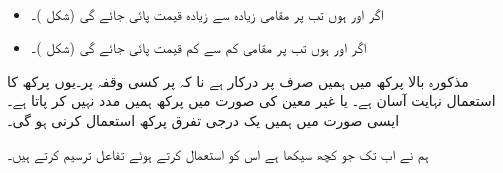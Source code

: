 \\
\begin{itemize}
\item
اگر  اور  ہوں تب  پر مقامی زیادہ سے زیادہ قیمت پائی جائے گی (شکل )۔
\item
اگر  اور  ہوں تب  پر مقامی کم سے کم قیمت پائی جائے گی (شکل )۔
\end{itemize}

مذکورہ بالا پرکھ میں ہمیں صرف  پر  درکار ہے نا کہ  پر کسی وقفہ پر۔یوں پرکھ کا استعمال نہایت آسان ہے۔   یا غیر معین  کی صورت میں پرکھ ہمیں مدد نہیں کر پاتا ہے۔ایسی صورت میں ہمیں یک درجی تفرق پرکھ استعمال کرنی ہو گی۔

ہم نے اب تک جو کچھ سیکھا ہے اس کو استعمال کرتے ہوئے تفاعل ترسیم کرتے ہیں۔

